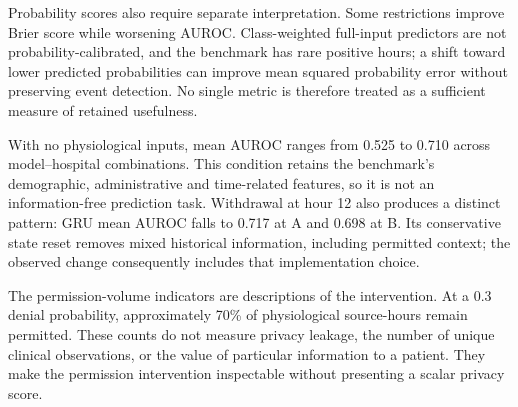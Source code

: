 Probability scores also require separate interpretation. Some restrictions improve Brier score while worsening AUROC. Class-weighted full-input predictors are not probability-calibrated, and the benchmark has rare positive hours; a shift toward lower predicted probabilities can improve mean squared probability error without preserving event detection. No single metric is therefore treated as a sufficient measure of retained usefulness.

With no physiological inputs, mean AUROC ranges from 0.525 to 0.710 across model--hospital combinations. This condition retains the benchmark's demographic, administrative and time-related features, so it is not an information-free prediction task. Withdrawal at hour 12 also produces a distinct pattern: GRU mean AUROC falls to 0.717 at A and 0.698 at B. Its conservative state reset removes mixed historical information, including permitted context; the observed change consequently includes that implementation choice.

The permission-volume indicators are descriptions of the intervention. At a 0.3 denial probability, approximately 70\% of physiological source-hours remain permitted. These counts do not measure privacy leakage, the number of unique clinical observations, or the value of particular information to a patient. They make the permission intervention inspectable without presenting a scalar privacy score.
